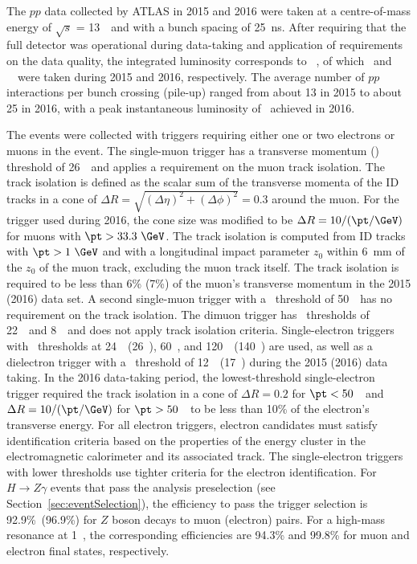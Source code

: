 The $pp$ data collected by ATLAS in 2015 and 2016 were taken at a centre-of-mass energy of $\sqrt{s}$ = 13~\TeV\
and with a bunch spacing of 25~ns. After requiring that the full detector was operational 
during data-taking and application of requirements on the
data quality, the integrated luminosity corresponds to \lumithirteentev~\invfb, of which \intLumiFifteen~and 
\intLumiSixteen~\ifb\ were taken during 2015 and 2016, respectively. 
The average number of $pp$ interactions per bunch crossing (pile-up) ranged from about 13 in 2015 to about 25 in 2016,
with a peak instantaneous luminosity of \peakLumi\ achieved in 2016.

The events were collected with triggers requiring either one or two electrons or muons in the event.
The single-muon trigger has a transverse momentum (\pt) threshold of 26~\GeV\ and applies a 
requirement on the muon track isolation. The track isolation
is defined as the scalar sum of the transverse momenta of the ID tracks 
in a cone of $\Delta R = \sqrt{(\Delta\eta)^2 + (\Delta\phi)^2} = 0.3$ around the muon.
For the trigger used during 2016, the cone size was modified to be $\Delta R = 10 / (\pt/\GeV)$ for
muons with $\pt > 33.3~\GeV$.
The track isolation is computed from ID tracks with
$\pt > 1~\GeV$ and with a longitudinal impact parameter $z_0$ within 6~mm of the $z_0$ of the muon track,
excluding the muon track itself.
The track isolation is required to be less than 
6\% (7\%) of the muon's transverse momentum in the 2015 (2016) data set.
A second single-muon trigger with a \pt\ threshold of 50~\GeV\ has no requirement on the track isolation.
The dimuon trigger has \pt\ thresholds of 22~\GeV\ and 8~\GeV\ 
and does not apply track isolation criteria. Single-electron triggers with 
\pt\ thresholds at 24~\GeV\ (26~\GeV), 60~\GeV, and 120~\GeV\ (140~\GeV) are used, 
as well as a dielectron trigger with
a \pt\ threshold of 12~\GeV\ (17~\GeV) during the 2015 (2016) data taking. 
In the 2016 data-taking period, the lowest-threshold single-electron
trigger required the track isolation in a cone of $\Delta R = 0.2$ for $\pt < 50$~\GeV\ and 
$\Delta R = 10 / (\pt/\GeV)$ for $\pt > 50$~\GeV\ to be less than 10\% of the electron's 
transverse energy.
For all electron triggers, electron candidates must satisfy
identification criteria based on the properties of the energy cluster in the 
electromagnetic calorimeter and its associated track. The single-electron triggers with lower
thresholds use tighter criteria for the electron identification.
For $H\to Z\gamma$ events that pass the analysis preselection (see Section~\ref{sec:eventSelection}), 
the efficiency to pass the trigger selection is 92.9\%~(96.9\%) for $Z$ boson decays to
muon (electron) pairs.
For a high-mass resonance at 1~\TeV,
the corresponding efficiencies are 94.3\% and 99.8\% for muon and electron final states, respectively.
